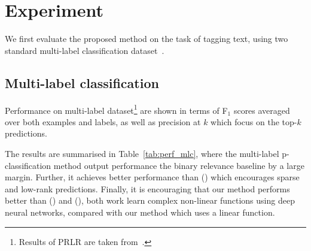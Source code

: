 \section{Experiment}
\label{sec:experiment}

We first evaluate the proposed method on the task of tagging text, 
using two standard multi-label classification dataset~\cite{katakis2008multilabel}.

\subsection{Multi-label classification}

Performance on multi-label dataset\footnote{Results of PRLR are taken from~\citep{lin2014multi}.}
are shown in terms of F$_1$ scores averaged over both examples and labels, 
as well as precision at $k$ which focus on the top-$k$ predictions.

The results are summarised in Table~\ref{tab:perf_mlc},
where the multi-label p-classification method output performance the binary relevance baseline by a large margin.
Further, it achieves better performance than (\citet{lin2014multi}) which encourages sparse and low-rank predictions.
Finally, it is encouraging that our method performs better than (\citet{belanger2016structured}) and (\citet{gygli2017deep}),
both work learn complex non-linear functions using deep neural networks, compared with our method which uses a linear function.

\begin{table}[!h]
\centering
\caption{Performance on multi-label dataset}
\label{tab:perf_mlc}
\end{table}


